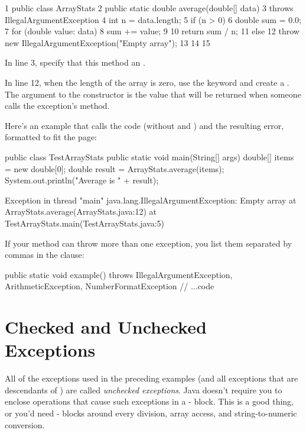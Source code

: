\begin{code}
 1  public class ArrayStats {
 2    public static double average(double[] data) 
 3     throws IllegalArgumentException {
 4      int n = data.length;
 5      if (n > 0) {
 6        double sum = 0.0;
 7        for (double value: data) {
 8          sum += value;
 9        }
10        return sum / n;
11      } else {
12        throw new IllegalArgumentException("Empty array");
13      }
14    }
15  }
\end{code}

In line 3, specify that this method  an .

In line 12, when the length of the array is zero, use the keyword  and create a  . The argument to the constructor is the value that will be returned when someone calls
the exception's  method.

Here's an example that calls the code (without  and ) and the resulting error, formatted to fit the page:

\begin{code}
public class TestArrayStats {
    public static void main(String[] args) {
        double[] items = new double[0];
        double result = ArrayStats.average(items);
        System.out.println("Average is " + result);
    }
}

Exception in thread "main"
  java.lang.IllegalArgumentException: Empty array
        at ArrayStats.average(ArrayStats.java:12)
        at TestArrayStats.main(TestArrayStats.java:5)
\end{code}

If your method can throw more than one exception, you list them separated by commas in the  clause:

\begin{code}
public static void example() throws IllegalArgumentException,
  ArithmeticException, NumberFormatException {
    // ...code
}
\end{code}

\section{Checked and Unchecked Exceptions}

All of the exceptions used in the preceding examples (and all exceptions that are descendants of ) are called {\em unchecked exceptions}. Java doesn't require you to enclose operations that cause such exceptions in a - block. This is a good thing, or you'd need - blocks around every division, array access, and string-to-numeric conversion.

